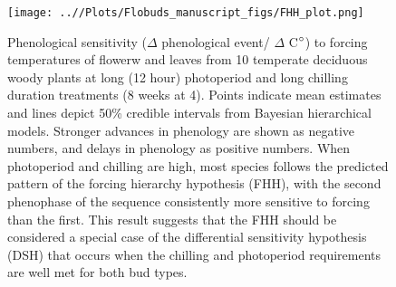 \documentclass[11pt]{article}\usepackage[]{graphicx}\usepackage[]{color}
\begin{document}
\begin{figure}[h!]
    \centering
         \texttt{[image: ..//Plots/Flobuds\_manuscript\_figs/FHH\_plot.png]}
    \caption{Phenological sensitivity ($\Delta$ phenological event/ $\Delta$ C$\degree$) to forcing temperatures of flowerw and leaves from 10 temperate deciduous woody plants at long (12 hour) photoperiod and long chilling duration treatments (8 weeks at 4\degree ). Points indicate mean estimates and lines depict 50\% credible intervals from Bayesian hierarchical models. Stronger advances in phenology are shown as negative numbers, and delays in phenology as positive numbers. When photoperiod and chilling are high, most species follows the predicted pattern of the forcing hierarchy hypothesis (FHH), with the second phenophase of the sequence consistently more sensitive to forcing than the first. This result suggests that the FHH should be considered a special case of the differential sensitivity hypothesis (DSH) that occurs when the chilling and photoperiod requirements are well met for both bud types.}
    \label{fig:FHH}
\end{figure}

\pagebreak
\end{document}
